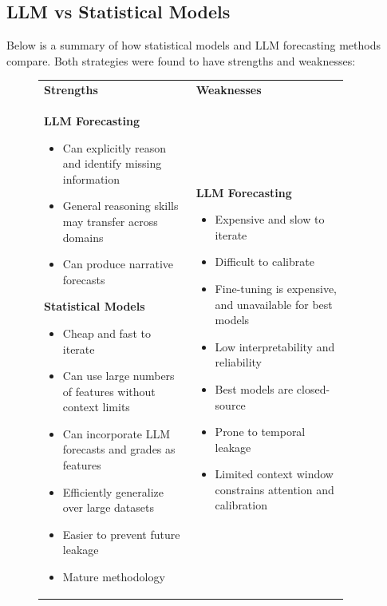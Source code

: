 \documentclass[12pt,a4paper]{article}
\begin{document}
\subsection{LLM vs Statistical Models}
Below is a summary of how statistical models and LLM forecasting methods compare. Both strategies were found to have strengths and weaknesses:
\begin{figure}[!htbp]
\centering
\renewcommand{\arraystretch}{1.3}
\begin{tabular}{p{0.45\linewidth} p{0.45\linewidth}}

\textbf{Strengths} &
\textbf{Weaknesses} \\

\textbf{LLM Forecasting}
\begin{itemize}[noitemsep,topsep=0pt]
  \item Can explicitly reason and identify missing information
  \item General reasoning skills may transfer across domains
  \item Can produce narrative forecasts
\end{itemize}

\textbf{Statistical Models}
\begin{itemize}[noitemsep,topsep=0pt]
  \item Cheap and fast to iterate
  \item Can use large numbers of features without context limits
  \item Can incorporate LLM forecasts and grades as features
  \item Efficiently generalize over large datasets
  \item Easier to prevent future leakage
  \item Mature methodology
\end{itemize}

&
\textbf{LLM Forecasting}
\begin{itemize}[noitemsep,topsep=0pt]
  \item Expensive and slow to iterate
  \item Difficult to calibrate
  \item Fine-tuning is expensive, and unavailable for best models
  \item Low interpretability and reliability
  \item Best models are closed-source
  \item Prone to temporal leakage
  \item Limited context window constrains attention and calibration
\end{itemize}


\end{tabular}
\end{figure}
\end{document}
